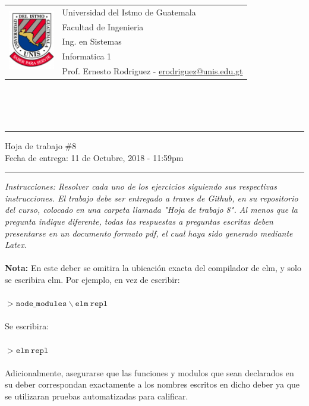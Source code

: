 \documentclass{article}
\newcommand{\horrule}[1]{\rule{\linewidth}{#1}}
\begin{document}
\begin{tabular}{l l}
\multirow{5}{*}{\includegraphics[width=2cm]{../../recursos/logo.png}}
 & Universidad del Istmo de Guatemala \\
 & Facultad de Ingenieria \\
 & Ing. en Sistemas \\
 & Informatica 1 \\
 & Prof. Ernesto Rodriguez - \href{mailto:erodriguez@unis.edu.gt}{erodriguez@unis.edu.gt} \\
\end{tabular}
\\\\\\

\begin{center}
        \horrule{0.5pt}
        \huge{Hoja de trabajo \#8} \\
        \large{Fecha de entrega: 11 de Octubre, 2018 - 11:59pm} \\
        \horrule{1pt}
\end{center}

\emph{Instrucciones: Resolver cada uno de los ejercicios siguiendo sus respectivas
instrucciones. El trabajo debe ser entregado a traves de Github, en su repositorio del curso, colocado en una
carpeta llamada "Hoja de trabajo 8". Al menos que la pregunta indique diferente, todas las
respuestas a preguntas escritas deben presentarse en un documento formato pdf, el cual
haya sido generado mediante Latex. }\\\\

{\bf Nota: }En este deber se omitira la ubicaci\'on exacta del compilador
de elm, y solo se escribira elm. Por ejemplo, en vez de escribir:\\\\
$>\mathtt{node\_modules}\backslash\mathtt{elm\ repl}$\\\\
Se escribira:\\\\
$>\mathtt{elm\ repl}$\\\\
Adicionalmente, asegurarse que las funciones y modulos que sean declarados
en su deber correspondan exactamente a los nombres escritos en dicho deber
ya que se utilizaran pruebas automatizadas para calificar.
\\\\
\end{document}
